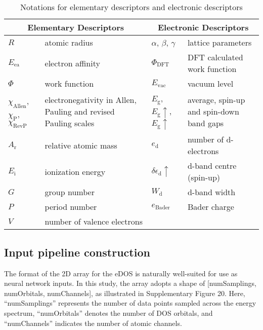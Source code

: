 \begin{table}[h]
  \centering
  \begin{tabular}{llll}
    \hline
    \multicolumn{2}{c}{Elementary Descriptors}       & \multicolumn{2}{c}{Electronic Descriptors}            \\
    \hline
    $R$            & atomic radius                   & $\alpha$, $\beta$, $\gamma$  & lattice parameters     \\
    $E_\text{ea}$  & electron affinity               & $\Phi_{\text{DFT}}$    & DFT calculated work function \\
    $\Phi$         & work function                   & $E_\text{vac}$         & vacuum level                 \\
    $\chi_\text{Allen}$, $\chi_\text{P}$, $\chi_\text{RevP}$
    & \parbox[t]{4cm}{electronegativity in Allen, Pauling and revised Pauling scales}
    & $E_\text{g}$, $E_\text{g}\uparrow$, $E_\text{g}\uparrow$
    & \parbox[t]{4cm}{average, spin-up and spin-down band gaps}                                              \\
    $A_\text{r}$   & relative atomic mass            & $e_\text{d}$           & number of d-electrons        \\
    $E_\text{i}$   & ionization energy & $\delta\epsilon_{\text{d}}\uparrow$  & d-band centre (spin-up)      \\
    $G$            & group number                    & $W_\text{d}$           & d-band width                 \\
    $P$            & period number                   & $e_{\text{Bader}}$     & Bader charge                 \\
    $V$            & number of valence electrons     &                        &                              \\
    \hline
  \end{tabular}
  \caption{Notations for elementary descriptors and electronic descriptors}
  \label{si_table15:descriptor_notations}
\end{table}


\subsection{Input pipeline construction}
The format of the 2D array for the eDOS is naturally well-suited for use as neural network inputs.
In this study, the array adopts a shape of [numSamplings, numOrbitals, numChannels], as illustrated in Supplementary Figure 20.
Here, “numSamplings” represents the number of data points sampled across the energy spectrum,
“numOrbitals” denotes the number of DOS orbitals,
and “numChannels” indicates the number of atomic channels.


